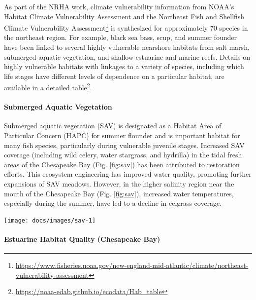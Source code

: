 \documentclass[
  10pt,
]{article}
\let\origfigure\figure
\let\endorigfigure\endfigure
\renewenvironment{figure}[1][2] {
    \expandafter\origfigure\expandafter[H]
} {
    \endorigfigure
}
\begin{document}
As part of the NRHA work, climate vulnerability information from NOAA's
Habitat Climate Vulnerability Assessment and the Northeast Fish and
Shellfish Climate Vulnerability Assessment\footnote{\url{https://www.fisheries.noaa.gov/new-england-mid-atlantic/climate/northeast-vulnerability-assessment}}
is synthesized for approximately 70 species in the northeast region. For
example, black sea bass, scup, and summer founder have been linked to
several highly vulnerable nearshore habitats from salt marsh, submerged
aquatic vegetation, and shallow estuarine and marine reefs. Details on
highly vulnerable habitats with linkages to a variety of species,
including which life stages have different levels of dependence on a
particular habitat, are available in a detailed table\footnote{\url{https://noaa-edab.github.io/ecodata/Hab_table}}.

\hypertarget{submerged-aquatic-vegetation}{%
\paragraph{Submerged Aquatic
Vegetation}\label{submerged-aquatic-vegetation}}

Submerged aquatic vegetation (SAV) is designated as a Habitat Area of
Particular Concern (HAPC) for summer flounder and is important habitat
for many fish species, particularly during vulnerable juvenile stages.
Increased SAV coverage (including wild celery, water stargrass, and
hydrilla) in the tidal fresh areas of the Chesapeake Bay (Fig.
\ref{fig:sav}) has been attributed to restoration efforts. This
ecosystem engineering has improved water quality, promoting further
expansions of SAV meadows. However, in the higher salinity region near
the mouth of the Chesapeake Bay (Fig. \ref{fig:sav}), increased water
temperatures, especially during the summer, have led to a decline in
eelgrass coverage.

\begin{figure}

{\centering \texttt{[image: docs/images/sav-1]} 

}

\caption{Submerged Aquatic Vegetation (SAV) coverage in tidal fresh and high salinity regions of the Chesapeake Bay.}\label{fig:sav}
\end{figure}

\hypertarget{estuarine-habitat-quality-chesapeake-bay}{%
\paragraph{Estuarine Habitat Quality (Chesapeake
Bay)}\label{estuarine-habitat-quality-chesapeake-bay}}
\end{document}
